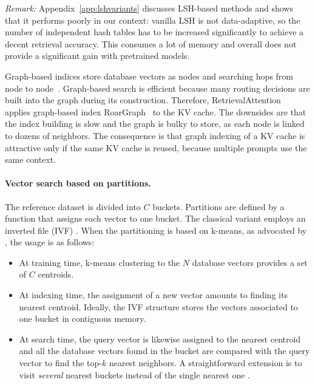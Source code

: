 \textit{Remark:} Appendix~\ref{app:lshvariants} discusses LSH-based methods and shows that it performs poorly in our context: vanilla LSH is not data-adaptive, so the number of independent hash tables has to be increased significantly to achieve a decent retrieval accuracy. This consumes a lot of memory and overall does not provide a significant gain with pretrained models.  
%

Graph-based indices store database vectors as nodes and searching hops from node to node~\citep{dong2011efficient,malkov2018efficient,fu2017fast,chen2024roargraph,jayaram2019diskann,ootomo2024cagra}. 
Graph-based search is efficient because many routing decisions are built into the graph during its construction. 
Therefore, RetrievalAttention~\citep{liu2024retrievalattention} applies graph-based index RoarGraph~\cite{chen2024roargraph} to the KV cache. 
The downsides are that the index building is slow and the graph is bulky to store, as each node is linked to dozens of neighbors. 
The consequence is that graph indexing of a KV cache is attractive only if the same KV cache is reused, \eg because multiple prompts use the same context. 

\paragraph{Vector search based on partitions.}

\newcommand{\nlist}{C}
\newcommand{\nprobe}{\ell}

The reference dataset is divided into $\nlist$ buckets.
Partitions are defined by a function that assigns each vector to one bucket. 
The classical variant employs an inverted file (IVF) \cite{witten1999managing}. 
When the partitioning is based on k-means, as advocated by \citet{pauleve2010locality}, the usage is as follows: 
%
\ificml
\\[-2.1em]
\fi

\begin{itemize}
\item At training time, k-means clustering to the $N$ database vectors provides a set of $\nlist$ centroids.  \\[-1.7em]
\item At indexing time, the assignment of a new vector amounts to finding its nearest centroid.  
Ideally, the IVF structure stores the vectors associated to one bucket in contiguous memory.  \\[-1.7em]
%
\item At search time, the query vector is likewise assigned to the nearest centroid and all the database vectors found in the bucket are compared with the query vector to find the top-$k$ nearest neighbors. 
A straightforward extension is to visit \emph{several} 
%
nearest buckets instead of the single nearest one \citep{lv2007multi}. 
\ificml
 \\[-1.9em]
 \fi
\end{itemize}

